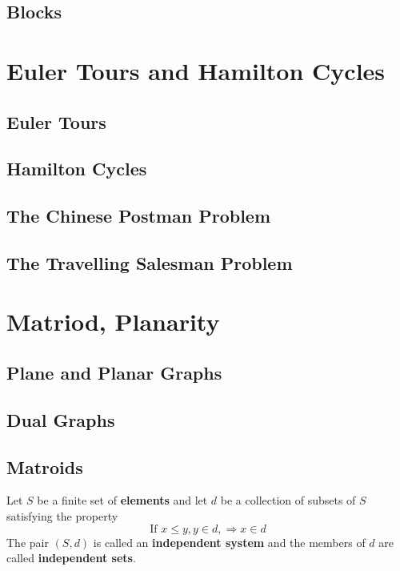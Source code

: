 		\section{Blocks}

	\chapter{Euler Tours and Hamilton Cycles}
		\section{Euler Tours}

		\section{Hamilton Cycles}

		\section{The Chinese Postman Problem}

		\section{The Travelling Salesman Problem}

	\chapter{Matriod, Planarity}
		\section{Plane and Planar Graphs}

		\section{Dual Graphs}

		\section{Matroids}
			\begin{definition}[Matroids]
				Let $S$ be a finite set of \textbf{elements} and let $d$ be a collection of subsets of $S$ satisfying the property
				\begin{equation}
					\text{If } x \le y, y\in d, \Rightarrow x \in d
				\end{equation}
				The pair $(S, d)$ is called an \textbf{independent system} and the members of $d$ are called \textbf{independent sets}.
			\end{definition}

